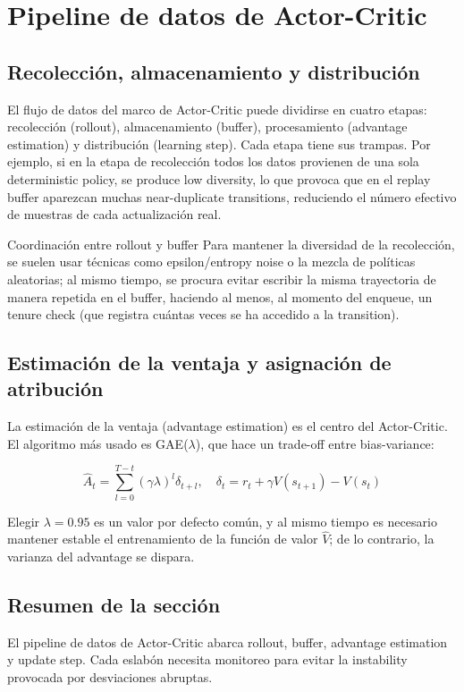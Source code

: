 \section{Pipeline de datos de Actor-Critic}

\subsection{Recolección, almacenamiento y distribución}

El flujo de datos del marco de Actor-Critic puede dividirse en cuatro etapas: recolección (rollout), almacenamiento (buffer), procesamiento (advantage estimation) y distribución (learning step). Cada etapa tiene sus trampas. Por ejemplo, si en la etapa de recolección todos los datos provienen de una sola deterministic policy, se produce low diversity, lo que provoca que en el replay buffer aparezcan muchas near-duplicate transitions, reduciendo el número efectivo de muestras de cada actualización real.

\begin{knowledgebox}{Coordinación entre rollout y buffer}
Para mantener la diversidad de la recolección, se suelen usar técnicas como epsilon/entropy noise o la mezcla de políticas aleatorias; al mismo tiempo, se procura evitar escribir la misma trayectoria de manera repetida en el buffer, haciendo al menos, al momento del enqueue, un tenure check (que registra cuántas veces se ha accedido a la transition).
\end{knowledgebox}

\subsection{Estimación de la ventaja y asignación de atribución}

La estimación de la ventaja (advantage estimation) es el centro del Actor-Critic. El algoritmo más usado es GAE($\lambda$), que hace un trade-off entre bias-variance:

$$\hat{A}_t = \sum_{l=0}^{T-t}(\gamma \lambda)^l \delta_{t+l},\quad \delta_t = r_t + \gamma V(s_{t+1}) - V(s_t)$$

Elegir $\lambda=0.95$ es un valor por defecto común, y al mismo tiempo es necesario mantener estable el entrenamiento de la función de valor $\hat{V}$; de lo contrario, la varianza del advantage se dispara.

\subsection{Resumen de la sección}

El pipeline de datos de Actor-Critic abarca rollout, buffer, advantage estimation y update step. Cada eslabón necesita monitoreo para evitar la instability provocada por desviaciones abruptas.

